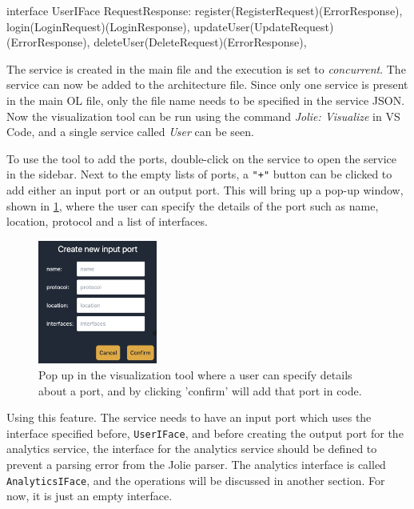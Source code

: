 \begin{jolisting}[][caption={The interface for the user service}, label={lst:useriface}]
interface UserIFace {
    RequestResponse:
        register(RegisterRequest)(ErrorResponse),
        login(LoginRequest)(LoginResponse),
        updateUser(UpdateRequest)(ErrorResponse),
        deleteUser(DeleteRequest)(ErrorResponse),
}
\end{jolisting}

The service is created in the main file and the execution is set to \textit{concurrent}.
The service can now be added to the architecture file. Since only one service is present in the main OL file, only the file name needs to be specified in the service JSON.
Now the visualization tool can be run using the command \textit{Jolie: Visualize} in VS Code, and a single service called \textit{User} can be seen.

To use the tool to add the ports, double-click on the service to open the service in the sidebar. Next to the empty lists of ports, a \texttt{"+"} button can be clicked to add either an input port or an output port.
This will bring up a pop-up window, shown in \cref{figure:popup_create_inputport}, where the user can specify the details of the port such as name, location, protocol and a list of interfaces.
\begin{figure}[h!]
    \center
    \includegraphics[width=0.35\textwidth]{figures/popup_create_inputport.png}
    \caption{Pop up in the visualization tool where a user can specify details about a port, and by clicking 'confirm' will add that port in code.}
    \label{figure:popup_create_inputport}
\end{figure}

Using this feature. The service needs to have an input port which uses the interface specified before, \texttt{UserIFace}, and before creating the output port for the analytics service, the interface for the analytics service should be defined to prevent a parsing error from the Jolie parser. 
The analytics interface is called \texttt{AnalyticsIFace}, and the operations will be discussed in another section. For now, it is just an empty interface.

